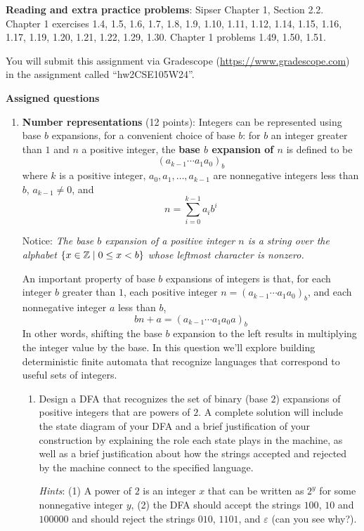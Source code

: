 {\bf Reading and extra practice problems}:  
Sipser Chapter 1, Section 2.2. 
Chapter 1 exercises 1.4, 1.5, 1.6, 1.7, 1.8, 1.9, 1.10, 1.11, 1.12, 1.14, 1.15, 
1.16, 1.17, 1.19, 1.20, 1.21, 1.22, 1.29, 1.30. Chapter 1 problems 1.49, 1.50, 1.51.

\instructions

You will submit this assignment via Gradescope
(\href{https://www.gradescope.com}{https://www.gradescope.com}) 
in the assignment called ``hw2CSE105W24''.

{\bf Assigned questions}
\begin{enumerate}[wide, labelwidth=!, labelindent=0pt]
\item \textbf{Number representations} (12 points):
Integers can be represented using base $b$ expansions, for a convenient choice of base $b$: 
for $b$ an integer greater than $1$ and $n$ a positive integer, 
the {\bf base $b$ expansion of $n$}  is defined to be
\[
(a_{k-1} \cdots a_1 a_0)_b
\]
where $k$ is a positive integer, $a_0, a_1, \ldots, a_{k-1}$ 
are nonnegative integers less than $b$, $a_{k-1} \neq  0$, and
\[
n =  \sum_{i=0}^{k-1} a_{i} b^{i}
\]

Notice: {\it The base $b$ expansion of a positive integer $n$ is a string over the alphabet 
$\{x \in \mathbb{Z} \mid 0 \leq x < b\}$
whose leftmost character is nonzero.}

An important property of base $b$ expansions of integers is that, for each integer $b$ greater than $1$,
each positive integer $n = (a_{k-1} \cdots a_1 a_0)_b$, and each nonnegative integer $a$ less than $b$, 
\[
    bn + a = (a_{k-1} \cdots a_1 a_0a)_b
\]
In other words, shifting the base $b$ expansion to the left results in multiplying the integer value by the base.
In this question we'll explore building deterministic finite automata that recognize 
languages that correspond to useful sets of integers.

    \begin{enumerate}
    \item\gradeCorrectFirst Design a DFA that recognizes the set of binary (base $2$) expansions of 
    positive integers that are powers of $2$. A complete solution will include the state diagram of your DFA and 
    a brief justification 
    of your construction by explaining the role each state plays in the machine, as well as a brief 
    justification about how the strings accepted and rejected by the machine connect to the specified language.

    {\it Hints}: (1) A power of $2$ is an integer $x$ that can be written as $2^y$ for some nonnegative integer $y$, 
    (2) the DFA should accept the strings $100$, $10$ and $100000$ and should reject the 
    strings $010$, $1101$, and $\varepsilon$ (can you see why?).


\end{enumerate}
\end{enumerate}
